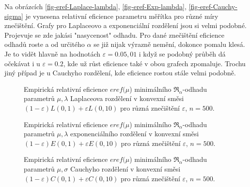Na obrázcích \ref{fig-eref-Laplace-lambda}, \ref{fig-eref-Exp-lambda}, \ref{fig-eref-Cauchy-sigma} je vynesena relativní eficience parametru měřítka pro různé míry znečištění. Grafy pro Laplaceovo a exponenciální rozdělení jsou si velmi podobné. Projevuje se zde jakási "nasycenost" odhadu. Pro dané znečištění eficience odhadů roste a od určitého $\alpha$ se již nijak výrazně nemění, dokonce pomalu klesá. Je to vidět hlavně na hodnotách $\varepsilon = 0.05,01$ i když se podobný průběh dá očekávat i u $\varepsilon = 0.2$, kde už růst eficience také v obou grafech zpomaluje. Trochu jiný případ je u Cauchyho rozdělení, kde eficience rostou stále velmi podobně. 

\begin{figure}[htb]
	\begin{center}
		\caption{ Empirická relativní eficience $eref({\mu}$) minimálního $\mathfrak{R}_\alpha$-odhadu parametrů  $\mu,\lambda$ Laplaceova rozdělení v konvexní směsi	$(1-\varepsilon)L(0,1) + \varepsilon L(0,10)$ pro různá znečištění $\varepsilon$, $n=500$. }
		\label{fig-eref-Laplace-mu}
	\end{center}
\end{figure}

\begin{figure}[htb]
	\begin{center}
		\caption{ Empirická relativní eficience $eref({\mu}$) minimálního $\mathfrak{R}_\alpha$-odhadu parametrů  $\mu,\lambda$ exponenciálního rozdělení v konvexní směsi	$(1-\varepsilon)E(0,1) + \varepsilon E(0,10)$ pro různá znečištění $\varepsilon $, $n=500$. }
		\label{fig-eref-Exp-mu}
	\end{center}
\end{figure}

\begin{figure}[htb]
	\begin{center}
		\caption{Empirická relativní eficience $eref({\mu}$) minimálního $\mathfrak{R}_\alpha$-odhadu parametrů  $\mu,\sigma$ Cauchyho rozdělení v konvexní směsi	$(1-\varepsilon)C(0,1) + \varepsilon C(0,10)$ pro různá znečištění $\varepsilon$, $n=500$.}
		\label{fig-eref-Cauchy-mu}
	\end{center}
\end{figure}

